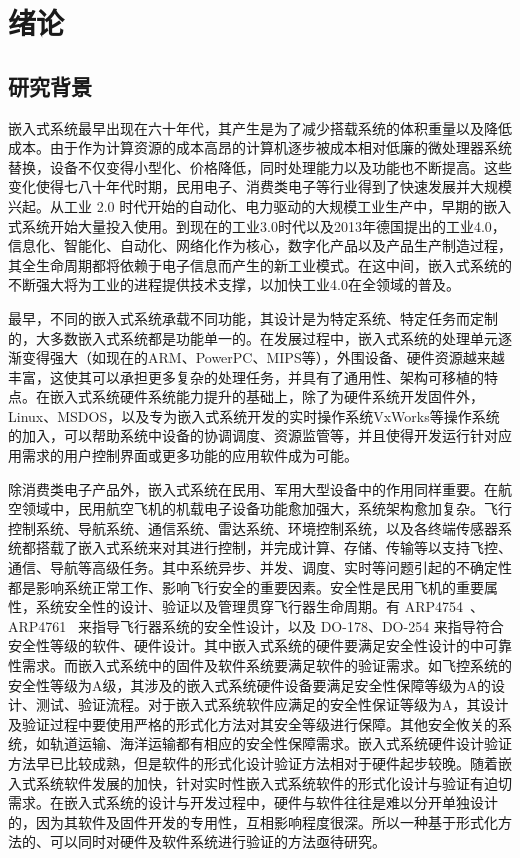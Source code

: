 \chapter{绪论}
\label{cha:intro}

\section{研究背景}


嵌入式系统最早出现在六十年代，其产生是为了减少搭载系统的体积重量以及降低成本。由于作为计算资源的成本高昂的计算机逐步被成本相对低廉的微处理器系统替换，设备不仅变得小型化、价格降低，同时处理能力以及功能也不断提高。这些变化使得七八十年代时期，民用电子、消费类电子等行业得到了快速发展并大规模兴起。从工业 2.0 时代开始的自动化、电力驱动的大规模工业生产中，早期的嵌入式系统开始大量投入使用。到现在的工业3.0时代以及2013年德国提出的工业4.0，信息化、智能化、自动化、网络化作为核心，数字化产品以及产品生产制造过程，其全生命周期都将依赖于电子信息而产生的新工业模式。在这中间，嵌入式系统的不断强大将为工业的进程提供技术支撑，以加快工业4.0在全领域的普及。

最早，不同的嵌入式系统承载不同功能，其设计是为特定系统、特定任务而定制的，大多数嵌入式系统都是功能单一的。在发展过程中，嵌入式系统的处理单元逐渐变得强大（如现在的ARM、PowerPC、MIPS等），外围设备、硬件资源越来越丰富，这使其可以承担更多复杂的处理任务，并具有了通用性、架构可移植的特点。在嵌入式系统硬件系统能力提升的基础上，除了为硬件系统开发固件外，Linux、MSDOS，以及专为嵌入式系统开发的实时操作系统VxWorks等操作系统的加入，可以帮助系统中设备的协调调度、资源监管等，并且使得开发运行针对应用需求的用户控制界面或更多功能的应用软件成为可能。

除消费类电子产品外，嵌入式系统在民用、军用大型设备中的作用同样重要。在航空领域中，民用航空飞机的机载电子设备功能愈加强大，系统架构愈加复杂。飞行控制系统、导航系统、通信系统、雷达系统、环境控制系统，以及各终端传感器系统都搭载了嵌入式系统来对其进行控制，并完成计算、存储、传输等以支持飞控、通信、导航等高级任务。其中系统异步、并发、调度、实时等问题引起的不确定性都是影响系统正常工作、影响飞行安全的重要因素。安全性是民用飞机的重要属性，系统安全性的设计、验证以及管理贯穿飞行器生命周期。有 ARP4754~\cite{ARP4754A}、ARP4761~\cite{ARP4761} 来指导飞行器系统的安全性设计，以及 DO-178、DO-254 来指导符合安全性等级的软件、硬件设计。其中嵌入式系统的硬件要满足安全性设计的中可靠性需求。而嵌入式系统中的固件及软件系统要满足软件的验证需求。如飞控系统的安全性等级为A级，其涉及的嵌入式系统硬件设备要满足安全性保障等级为A的设计、测试、验证流程。对于嵌入式系统软件应满足的安全性保证等级为A，其设计及验证过程中要使用严格的形式化方法对其安全等级进行保障。其他安全攸关的系统，如轨道运输、海洋运输都有相应的安全性保障需求。嵌入式系统硬件设计验证方法早已比较成熟，但是软件的形式化设计验证方法相对于硬件起步较晚。随着嵌入式系统软件发展的加快，针对实时性嵌入式系统软件的形式化设计与验证有迫切需求。在嵌入式系统的设计与开发过程中，硬件与软件往往是难以分开单独设计的，因为其软件及固件开发的专用性，互相影响程度很深。所以一种基于形式化方法的、可以同时对硬件及软件系统进行验证的方法亟待研究。




